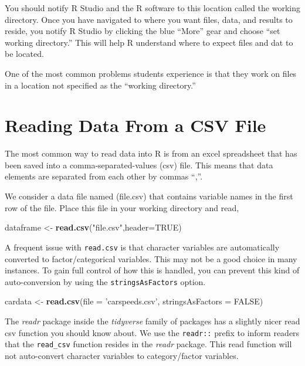 \documentclass[]{book}
\newenvironment{Shaded}{\begin{snugshade}}{\end{snugshade}}
\newcommand{\KeywordTok}[1]{\textcolor[rgb]{0.13,0.29,0.53}{\textbf{#1}}}
\newcommand{\DataTypeTok}[1]{\textcolor[rgb]{0.13,0.29,0.53}{#1}}
\newcommand{\StringTok}[1]{\textcolor[rgb]{0.31,0.60,0.02}{#1}}
\newcommand{\OtherTok}[1]{\textcolor[rgb]{0.56,0.35,0.01}{#1}}
\newcommand{\NormalTok}[1]{#1}
\begin{document}
You should notify R Studio and the R software to this location called
the working directory. Once you have navigated to where you want files,
data, and results to reside, you notify R Studio by clicking the blue
``More'' gear and choose ``set working directory.'' This will help R
understand where to expect files and dat to be located.

One of the most common problems students experience is that they work on
files in a location not specified as the ``working directory.''

\section{Reading Data From a CSV
File}\label{reading-data-from-a-csv-file}

The most common way to read data into R is from an excel spreadsheet
that has been saved into a comma-separated-values (csv) file. This means
that data elements are separated from each other by commas ``,''.

We consider a data file named (file.csv) that contains variable names in
the first row of the file. Place this file in your working directory and
read,

\begin{Shaded}
\begin{Highlighting}[]
\NormalTok{dataframe <-}\StringTok{ }\KeywordTok{read.csv}\NormalTok{(}\StringTok{"file.csv"}\NormalTok{,}\DataTypeTok{header=}\OtherTok{TRUE}\NormalTok{)}
\end{Highlighting}
\end{Shaded}

A frequent issue with \texttt{read.csv} is that character variables are
automatically converted to factor/categorical variables. This may not be
a good choice in many instances. To gain full control of how this is
handled, you can prevent this kind of auto-conversion by using the
\texttt{stringsAsFactors} option.

\begin{Shaded}
\begin{Highlighting}[]
\NormalTok{cardata <-}\StringTok{ }\KeywordTok{read.csv}\NormalTok{(}\DataTypeTok{file =} \StringTok{'carspeeds.csv'}\NormalTok{, }\DataTypeTok{stringsAsFactors =} \OtherTok{FALSE}\NormalTok{)}
\end{Highlighting}
\end{Shaded}

The \emph{readr} package inside the \emph{tidyverse} family of packages
has a slightly nicer read csv function you should know about. We use the
\texttt{readr::} prefix to inform readers that the \texttt{read\_csv}
function resides in the \emph{readr} package. This read function will
not auto-convert character variables to category/factor variables.
\end{document}
